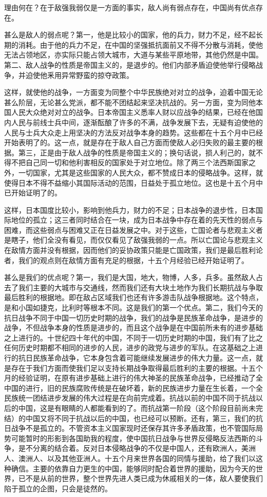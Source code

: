 理由何在？在于敌强我弱仅是一方面的事实，敌人尚有弱点存在，中国尚有优点存在。

甚么是敌人的弱点呢？第一，他是比较小的国家，他的兵力，财力不足，经不起长期的消耗。由于他的兵力不足，在中国的坚强抵抗面前又不得不分散与消耗，使他无法占领地区，亦实际只能占领大城市，大道与某些平原地带，其他仍然是中国。第二、敌人战争的性质是帝国主义的，是退步的。他们内部矛盾迫使他举行侵略战争，并迫使他釆用异常野蛮的掠夺政策。

这样，就使他的战争，一方面变为同整个中华民族绝对对立的战争，迫着中国无论甚么阶层，无论甚么党派，都不能不团结起来坚决抗战的。另一方面，变为同他本国人民大众绝对对立的战争。日本帝国主义悉率人财以应战争的结果，已经在他国内人民与前线士兵中间，逐渐酝酿了许多的不满，战争发展下去，无疑有迫使他的人民与士兵大众走上用坚决的方法反对战争本身的趋势。这些都在十五个月中已经开始表明了的。这一点，就是存在于敌人自己方面而使敌人必归失败的最主要的根据。第三，正是由于敌人战争的性质是帝国主义的；换句话说，损人利己的，就不得不把自己同一切和他利害相反的国家处于对立地位。除了两三个法西斯国家之外，一切国家，尤其是这些国家的人民大众，都不赞成日本的侵略战争。这样，就使得日本不得不益缩小其国际活动的范围，日益处于孤立地位。这也是十五个月中已开始证明了的。

这样，日本国度比较小，影响到他兵力，财力的不足；日本战争的退步性，日本国际地位的孤立；这三者同时结合在一块，成为日本战争中存在着的先天性的弱点与困难，而这些弱点与困难又正在日益发展之中。对于这些，亡国论者与悲观主义者是瞎子，他们全没有看见，而仅仅看见了敌强我弱的一点。所以亡国论与悲观主义在敌情方面并没有根据，因而他们的妥协政策只能是亡国政策，我们是最后胜利论者，我们的观点则在敌情方面有充足的根据，十五个月经验已经开始证明了。

甚么是我们的优点呢？第一，我们是大国，地大，物博，人多，兵多。虽然敌人占去了我们主要的大城市与交通线，然而我们还有大块土地作为我们长期抗战与争取最后胜利的根据地。即在敌占区域我们也还有许多游击队战争根据地。这个特点，是和小国如捷克，比利时等根本不同。这是我们的第一个优点。第二，我们今天的抗日战争不同于中国一切历史时期的战争，我们的战争是民族革命战争，是进步的战争，不但战争本身的性质是进步的，而且这个战争是在中国前所未有的进步基础之上进行的。十世纪四十年代的中国，不同于一切历史时期的中国，我们有了比之任何历史时期都不相同的进步的人民，进步的政党与进步的军队。在这基础之上进行的抗日民族革命战争，它本身包含着可能继续发展进步的伟大力量。这一点，就是存在于我们方面而使我们足以支持长期战争取得最后胜利的主要的根据。十五个月的经验证明，在原有进步基础上进行的伟大神圣的民族革命战争，已经推动了全中国的进行，旧的民族腐败传统是在破坏着，新的民族进步力量在生长着，一个全民族统一团结进步发展的伟大过程是在向前完成着。抗战以前的中国不同于抗战以后的中国，这是有眼睛的人都能看到的了。而抗战第一阶段（这个阶段目前尚未完结）的中国又将不同于抗战以后的中国，也已经可以预断。还有，第三，我们的抗日战争不是孤立的。不管资本主义国家现时还保存其许多矛盾政策，也不管国际局势可能暂时的形影到各国助我的程度，使中国抗日战争与世界反侵略反法西斯的斗争，是不分离的结合着。反对日本侵略战争的不仅是中国人，还有欧洲人，美洲人、澳洲人、以及其他亚洲人。十五个月来世界各国的同情与援助，给了我们以这种确信。主要的依靠自力更生的中国，能够同时配合着世界的援助，因为今天的世界，已不是从前的世界，整个世界先进人类已成为休戚相关的一体，敌人要使我们陷于孤立的企图，只会是徒然的。

